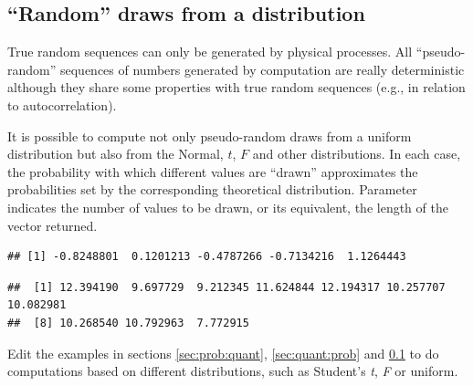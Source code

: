 \documentclass[krantz2]{krantz}\usepackage{knitr}
\begin{document}
\subsection{``Random'' draws from a distribution}\label{sec:stat:random}

True random sequences can only be generated by physical processes. All ``pseudo-random'' sequences of numbers generated by computation are really deterministic although they share some properties with true random sequences (e.g., in relation to autocorrelation).

It is possible to compute not only pseudo-random draws from a uniform distribution but also from the Normal, $t$, $F$ and other distributions. In each case, the probability with which different values are ``drawn'' approximates the probabilities set by the corresponding theoretical distribution. Parameter  indicates the number of values to be drawn, or its equivalent, the length of the vector returned.

\begin{knitrout}\footnotesize
{}\color{fgcolor}\begin{kframe}
\begin{alltt}
\hlstd{(}\hlstd{)}
\end{alltt}
\begin{verbatim}
## [1] -0.8248801  0.1201213 -0.4787266 -0.7134216  1.1264443
\end{verbatim}
\begin{alltt}
\hlstd{(} \hlstd{=} \hlstd{,}  \hlstd{=} \hlstd{,}  \hlstd{=} \hlstd{)}
\end{alltt}
\begin{verbatim}
##  [1] 12.394190  9.697729  9.212345 11.624844 12.194317 10.257707 10.082981
##  [8] 10.268540 10.792963  7.772915
\end{verbatim}
\end{kframe}
\end{knitrout}

\begin{playground}
Edit the examples in sections \ref{sec:prob:quant}, \ref{sec:quant:prob} and \ref{sec:stat:random} to do computations based on different distributions, such as Student's \emph{t}, \emph{F} or uniform.
\end{playground}
\end{document}
